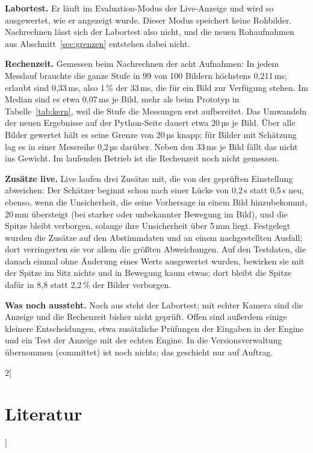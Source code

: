 \documentclass[11pt,a4paper,fleqn]{article}
\begin{document}
\textbf{Labortest.} Er läuft im Evaluation-Modus der Live-Anzeige und wird so ausgewertet, wie er angezeigt wurde.
Dieser Modus speichert keine Rohbilder. Nachrechnen lässt sich der Labortest also nicht, und die neuen Rohaufnahmen aus
Abschnitt~\ref{sec:grenzen} entstehen dabei nicht.

\textbf{Rechenzeit.} Gemessen beim Nachrechnen der acht Aufnahmen: In jedem Messlauf brauchte die ganze Stufe in 99 von
100 Bildern höchstens 0,211\,ms; erlaubt sind 0,33\,ms, also 1\,\% der 33\,ms, die für ein Bild zur Verfügung stehen.
Im Median sind es etwa 0,07\,ms je Bild, mehr als beim Prototyp in Tabelle~\ref{tab:kern}, weil die Stufe die
Messungen erst aufbereitet. Das Umwandeln der neuen Ergebnisse auf der Python-Seite dauert etwa 20\,µs je Bild. Über
alle Bilder gewertet hält es seine Grenze von 20\,µs knapp; für Bilder mit Schätzung lag es in einer Messreihe
0,2\,µs darüber. Neben den 33\,ms je Bild fällt das nicht ins Gewicht. Im laufenden Betrieb ist die Rechenzeit noch
nicht gemessen.

\textbf{Zusätze live.} Live laufen drei Zusätze mit, die von der geprüften Einstellung abweichen: Der Schätzer
beginnt schon nach einer Lücke von 0,2\,s statt 0,5\,s neu, ebenso, wenn die Unsicherheit, die seine Vorhersage in
einem Bild hinzubekommt, 20\,mm übersteigt (bei starker oder unbekannter Bewegung im Bild), und die Spitze bleibt
verborgen, solange ihre Unsicherheit über 5\,mm liegt. Festgelegt wurden die Zusätze auf den Abstimmdaten und an
einem nachgestellten Ausfall; dort verringerten sie vor allem die größten Abweichungen. Auf den Testdaten, die danach
einmal ohne Änderung eines Werts ausgewertet wurden, bewirken sie mit der Spitze im Sitz nichts und in Bewegung kaum
etwas; dort bleibt die Spitze dafür in 8,8 statt 2,2\,\% der Bilder verborgen.

\textbf{Was noch aussteht.} Noch aus steht der Labortest; mit echter Kamera sind die Anzeige und die Rechenzeit bisher
nicht geprüft. Offen sind außerdem einige kleinere Entscheidungen, etwa zusätzliche Prüfungen der Eingaben in der
Engine und ein Test der Anzeige mit der echten Engine. In die Versionsverwaltung übernommen (committet) ist noch
nichts; das geschieht nur auf Auftrag.

\begin{otherlanguage}{english}
\begin{multicols}{2}[\section*{Literatur}]
\raggedcolumns
\footnotesize
\raggedright


\end{multicols}
\end{otherlanguage}
\end{document}
